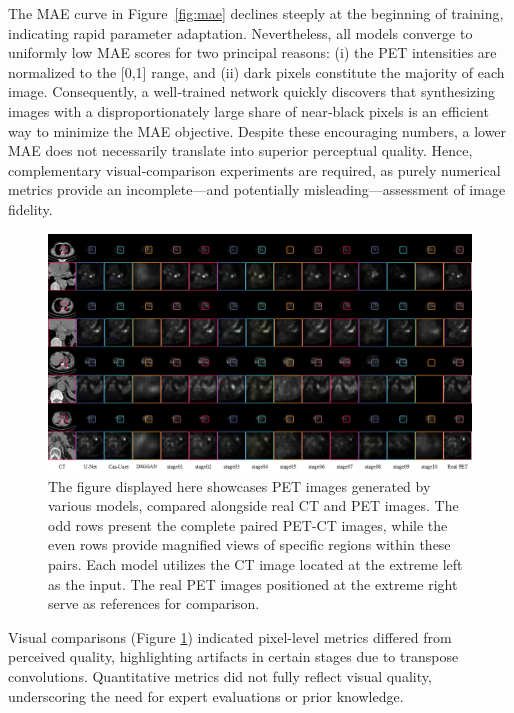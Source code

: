 \documentclass[a4paper, times, 10pt,twocolumn]{article}
\begin{document}
The MAE curve in Figure \ref{fig:mae} declines steeply at the beginning of training, indicating rapid parameter adaptation. Nevertheless, all models converge to uniformly low MAE scores for two principal reasons: (i) the PET intensities are normalized to the [0,1] range, and (ii) dark pixels constitute the majority of each image. Consequently, a well‑trained network quickly discovers that synthesizing images with a disproportionately large share of near‑black pixels is an efficient way to minimize the MAE objective.
Despite these encouraging numbers, a lower MAE does not necessarily translate into superior perceptual quality. Hence, complementary visual‑comparison experiments are required, as purely numerical metrics provide an incomplete—and potentially misleading—assessment of image fidelity.


\begin{figure}[h]
	\centering
	\includegraphics[width=1.0\linewidth]{u-net/lung/lung_compare_folder/lung_compare_13.png}
	\caption[lung_compare]{The figure displayed here showcases PET images generated by various models, compared alongside real CT and PET images. The odd rows present the complete paired PET-CT images, while the even rows provide magnified views of specific regions within these pairs. Each model utilizes the CT image located at the extreme left as the input. The real PET images positioned at the extreme right serve as references for comparison. }
	\label{fig:lung_compare}
\end{figure}
Visual comparisons (Figure \ref{fig:lung_compare}) indicated pixel-level metrics differed from perceived quality, highlighting artifacts in certain stages due to transpose convolutions. Quantitative metrics did not fully reflect visual quality, underscoring the need for expert evaluations or prior knowledge.
\end{document}
